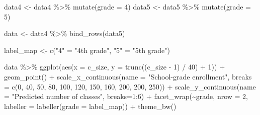 \documentclass[
  letterpaper,
  DIV=11,
  numbers=noendperiod]{scrartcl}
\newenvironment{Shaded}{\begin{snugshade}}{\end{snugshade}}
\newcommand{\AttributeTok}[1]{\textcolor[rgb]{0.40,0.45,0.13}{#1}}
\newcommand{\DecValTok}[1]{\textcolor[rgb]{0.68,0.00,0.00}{#1}}
\newcommand{\FunctionTok}[1]{\textcolor[rgb]{0.28,0.35,0.67}{#1}}
\newcommand{\NormalTok}[1]{\textcolor[rgb]{0.00,0.23,0.31}{#1}}
\newcommand{\OtherTok}[1]{\textcolor[rgb]{0.00,0.23,0.31}{#1}}
\newcommand{\SpecialCharTok}[1]{\textcolor[rgb]{0.37,0.37,0.37}{#1}}
\newcommand{\StringTok}[1]{\textcolor[rgb]{0.13,0.47,0.30}{#1}}
\begin{document}
\begin{Shaded}
\begin{Highlighting}[]
\NormalTok{data4 }\OtherTok{\textless{}{-}}\NormalTok{ data4 }\SpecialCharTok{\%\textgreater{}\%} \FunctionTok{mutate}\NormalTok{(}\AttributeTok{grade =} \DecValTok{4}\NormalTok{)}
\NormalTok{data5 }\OtherTok{\textless{}{-}}\NormalTok{ data5 }\SpecialCharTok{\%\textgreater{}\%} \FunctionTok{mutate}\NormalTok{(}\AttributeTok{grade =} \DecValTok{5}\NormalTok{)}

\NormalTok{data }\OtherTok{\textless{}{-}}\NormalTok{ data4 }\SpecialCharTok{\%\textgreater{}\%} \FunctionTok{bind\_rows}\NormalTok{(data5)}

\NormalTok{label\_map }\OtherTok{\textless{}{-}} \FunctionTok{c}\NormalTok{(}\StringTok{"4"} \OtherTok{=} \StringTok{"4th grade"}\NormalTok{, }\StringTok{"5"} \OtherTok{=} \StringTok{"5th grade"}\NormalTok{)}

\NormalTok{data }\SpecialCharTok{\%\textgreater{}\%}  
  \FunctionTok{ggplot}\NormalTok{(}\FunctionTok{aes}\NormalTok{(}\AttributeTok{x =}\NormalTok{ c\_size, }\AttributeTok{y =} \FunctionTok{trunc}\NormalTok{((c\_size }\SpecialCharTok{{-}} \DecValTok{1}\NormalTok{) }\SpecialCharTok{/} \DecValTok{40}\NormalTok{) }\SpecialCharTok{+} \DecValTok{1}\NormalTok{)) }\SpecialCharTok{+}
  \FunctionTok{geom\_point}\NormalTok{() }\SpecialCharTok{+}
  \FunctionTok{scale\_x\_continuous}\NormalTok{(}\AttributeTok{name =} \StringTok{"School{-}grade enrollment"}\NormalTok{, }\AttributeTok{breaks =} \FunctionTok{c}\NormalTok{(}\DecValTok{0}\NormalTok{, }\DecValTok{40}\NormalTok{, }\DecValTok{50}\NormalTok{, }\DecValTok{80}\NormalTok{, }\DecValTok{100}\NormalTok{, }\DecValTok{120}\NormalTok{, }\DecValTok{150}\NormalTok{, }\DecValTok{160}\NormalTok{, }\DecValTok{200}\NormalTok{, }\DecValTok{200}\NormalTok{, }\DecValTok{250}\NormalTok{)) }\SpecialCharTok{+}
  \FunctionTok{scale\_y\_continuous}\NormalTok{(}\AttributeTok{name =} \StringTok{"Predicted number of classes"}\NormalTok{, }\AttributeTok{breaks=}\DecValTok{1}\SpecialCharTok{:}\DecValTok{6}\NormalTok{) }\SpecialCharTok{+}
  \FunctionTok{facet\_wrap}\NormalTok{(}\SpecialCharTok{\textasciitilde{}}\NormalTok{grade, }\AttributeTok{nrow =} \DecValTok{2}\NormalTok{, }\AttributeTok{labeller =} \FunctionTok{labeller}\NormalTok{(}\AttributeTok{grade =}\NormalTok{ label\_map)) }\SpecialCharTok{+}
  \FunctionTok{theme\_bw}\NormalTok{()}
\end{Highlighting}
\end{Shaded}
\end{document}
